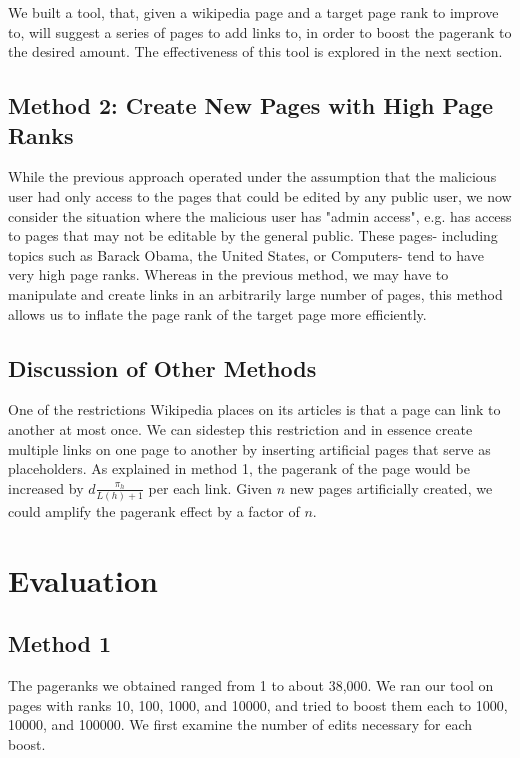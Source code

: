\documentclass{article}
\begin{document}
We built a tool, that, given a wikipedia page and a target page rank to improve
to, will suggest a series of pages to add links to, in order to boost the
pagerank to the desired amount. The effectiveness of this tool is explored in
the next section.

\subsection*{Method 2: Create New Pages with High Page Ranks}

While the previous approach operated under the assumption that the malicious user 
had only access to the pages that could be edited by any public user, we now consider 
the situation where the malicious user has "admin access", e.g. has access to pages
that may not be editable by the general public. These pages- including topics such as 
Barack Obama, the United States, or Computers- tend to have very high page ranks.
Whereas in the previous method, we may have to manipulate and create links in an arbitrarily
large number of pages, this method allows us to inflate the page rank of the target page more efficiently.

\subsection*{Discussion of Other Methods}

One of the restrictions Wikipedia places on its articles is that a page can link to another at most once. 
We can sidestep this restriction and in essence create multiple links on one page to another by inserting artificial pages
that serve as placeholders. As explained in method 1, the pagerank of the page would be increased by $d \frac{\pi_h}{L(h)+1}$
per each link. Given $n$ new pages artificially created, we could amplify the pagerank effect by a factor of $n$.

\section*{Evaluation}

\subsection*{Method 1}

The pageranks we obtained ranged from 1 to about 38,000. We ran our tool on
pages with ranks 10, 100, 1000, and 10000, and tried to boost
them each to 1000, 10000, and 100000. We first examine the number of edits necessary for each boost. \\
\end{document}
